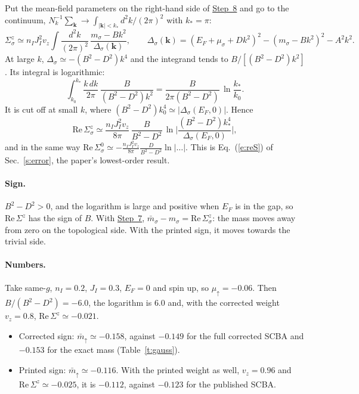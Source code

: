 \documentclass[11pt,a4paper]{article}
\newcommand{\up}{{\uparrow}}
\begin{document}
Put the mean-field parameters on the right-hand side of \hyperref[st:equations]{Step~8} and go to the
continuum, $N_k^{-1}\sum_{\bm k}\to\int_{|\bm k|<k_*}d^2k/(2\pi)^2$ with $k_*=\pi$:
\begin{equation}
\Sigma^z_\sigma\simeq n_IJ_I^2v_z\int\!\frac{d^2k}{(2\pi)^2}\,\frac{m_\sigma-Bk^2}{\Delta_\sigma(\bm k)},\qquad
\Delta_\sigma(\bm k)=(E_F+\mu_\sigma+Dk^2)^2-(m_\sigma-Bk^2)^2-A^2k^2 .
\end{equation}
At large $k$, $\Delta_\sigma\simeq-(B^2-D^2)k^4$ and the integrand tends to $B/[(B^2-D^2)k^2]$. Its integral
is logarithmic:
\begin{equation}
\int_{k_0}^{k_*}\frac{k\,dk}{2\pi}\,\frac{B}{(B^2-D^2)k^2}=\frac{B}{2\pi(B^2-D^2)}\,\ln\frac{k_*}{k_0}.
\end{equation}
It is cut off at small $k$, where $(B^2-D^2)k_0^4\simeq|\Delta_\sigma(E_F,0)|$. Hence
\begin{equation}
\mathrm{Re}\,\Sigma^z_\sigma\simeq\frac{n_IJ_I^2v_z}{8\pi}\,\frac{B}{B^2-D^2}\,
\ln\Big|\frac{(B^2-D^2)k_*^4}{\Delta_\sigma(E_F,0)}\Big| ,
\end{equation}
and in the same way $\mathrm{Re}\,\Sigma^0_\sigma\simeq-\frac{n_IJ_I^2v_z}{8\pi}\frac{D}{B^2-D^2}\ln|\dots|$. This is
Eq.~(\ref{e:reS}) of Sec.~\ref{s:error}, the paper's lowest-order result.

\paragraph{Sign.} $B^2-D^2>0$, and the logarithm is large and positive when $E_F$ is in the gap, so
$\mathrm{Re}\,\Sigma^z$ has the sign of $B$. With \hyperref[st:identify]{Step~7}, $\bar m_\sigma-m_\sigma=\mathrm{Re}\,\Sigma^z_\sigma$:
the mass moves away from zero on the topological side. With the printed sign, it moves towards
the trivial side.

\paragraph{Numbers.} Take same-$g$, $n_I=0.2$, $J_I=0.3$, $E_F=0$ and spin up, so
$\mu_\up=-0.06$. Then $B/(B^2-D^2)=-6.0$, the logarithm is $6.0$ and, with the corrected weight
$v_z=0.8$, $\mathrm{Re}\,\Sigma^z\simeq-0.021$.
\begin{itemize}
\item Corrected sign: $\bar m_\up\simeq-0.158$, against $-0.149$ for the full corrected SCBA and
  $-0.153$ for the exact mass (Table~\ref{t:gauss}).
\item Printed sign: $\bar m_\up\simeq-0.116$. With the printed weight as well, $v_z=0.96$ and
  $\mathrm{Re}\,\Sigma^z\simeq-0.025$, it is $-0.112$, against $-0.123$ for the published SCBA.
\end{itemize}
\end{document}

